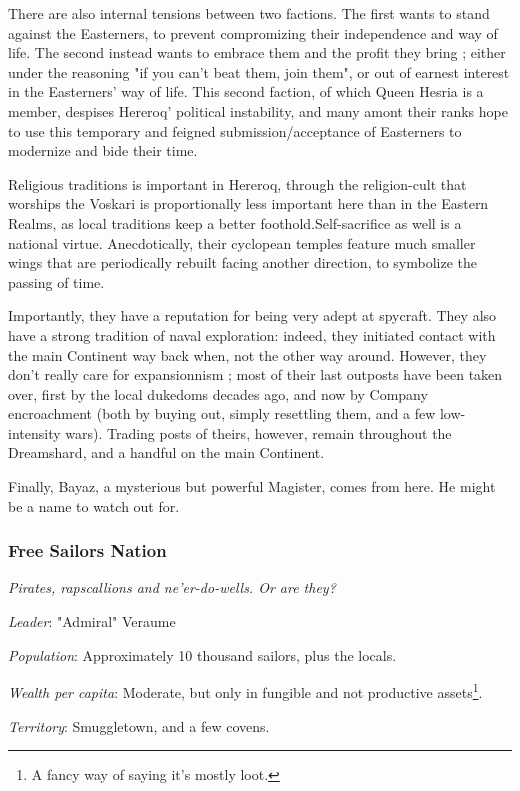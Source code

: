 There are also internal tensions between two factions. The first wants to stand against the Easterners, to prevent compromizing their independence and way of life. The second instead wants to embrace them and the profit they bring ; either under the reasoning "if you can't beat them, join them", or out of earnest interest in the Easterners' way of life. This second faction, of which Queen Hesria is a member, despises Hereroq' political instability, and many amont their ranks hope to use this temporary and feigned submission/acceptance of Easterners to modernize and bide their time.

Religious traditions is important in Hereroq, through the religion-cult that worships the Voskari is proportionally less important here than in the Eastern Realms, as local traditions keep a better foothold.Self-sacrifice as well is a national virtue. Anecdotically, their cyclopean temples feature much smaller wings that are periodically rebuilt facing another direction, to symbolize the passing of time.

Importantly, they have a reputation for being very adept at spycraft. They also have a strong tradition of naval exploration: indeed, they initiated contact with the main Continent way back when, not the other way around. However, they don't really care for expansionnism ; most of their last outposts have been taken over, first by the local dukedoms decades ago, and now by Company encroachment (both by buying out, simply resettling them, and a few low-intensity wars). Trading posts of theirs, however, remain throughout the Dreamshard, and a handful on the main Continent. 

Finally, Bayaz, a mysterious but powerful Magister, comes from here. He might be a name to watch out for.


\subsubsection{Free Sailors Nation}

\textit{Pirates, rapscallions and ne'er-do-wells. Or are they?}

\textit{Leader}: "Admiral" Veraume

\textit{Population}: Approximately 10 thousand sailors, plus the locals.

\textit{Wealth per capita}: Moderate, but only in fungible and not productive assets\footnote{A fancy way of saying it's mostly loot.}.

\textit{Territory}: Smuggletown, and a few covens.
    

